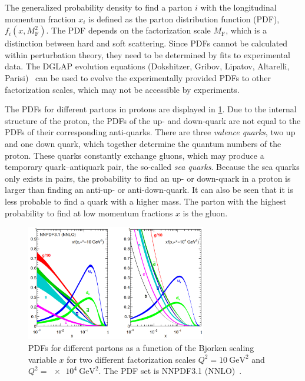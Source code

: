 The generalized probability density to find a parton $i$ with the longitudinal momentum fraction $x_i$ is defined as the
parton distribution function (PDF), $f_i(x, M_\text{F}^2)$.
The PDF depends on the factorization scale $M_\text{F}$, which is a distinction between hard and soft scattering.
Since PDFs cannot be calculated within perturbation theory, they need to be determined by fits to experimental data.
The DGLAP evolution equations (Dokshitzer, Gribov, Lipatov, Altarelli, Parisi)~\cite{dglap:d, dglap:gl, dglap:ap}
can be used to evolve the experimentally provided PDFs to other factorization scales, which may not be accessible by experiments.

The PDFs for different partons in protons are displayed in \cref{fig:theory:pdfs}.
Due to the internal structure of the proton, the PDFs of the up- and down-quark are not equal to the PDFs of their corresponding anti-quarks.
There are three \emph{valence quarks}, two up and one down quark, which together determine the quantum numbers of the proton.
These quarks constantly exchange gluons, which may produce a temporary quark--antiquark pair, the so-called \emph{sea quarks}.
Because the sea quarks only exists in pairs, the probability to find an up- or down-quark in a proton is larger than finding an
anti-up- or anti-down-quark.
It can also be seen that it is less probable to find a quark with a higher mass.
The parton with the highest probability to find at low momentum fractions $x$ is the gluon.

\begin{figure}[htb]
    \centering
    \includegraphics[width=0.7\textwidth]{./figures/theory/nnpdf.png}
    \caption{PDFs for different partons as a function of the Bjorken scaling variable $x$
             for two different factorization scales $Q^2 = \SI{10}{\GeV\squared}$ and $Q^2 = \SI{e4}{\GeV\squared}$.
             The PDF set is NNPDF3.1 (NNLO)~\cite{nnpdf3.1}.}\label{fig:theory:pdfs}
\end{figure}

